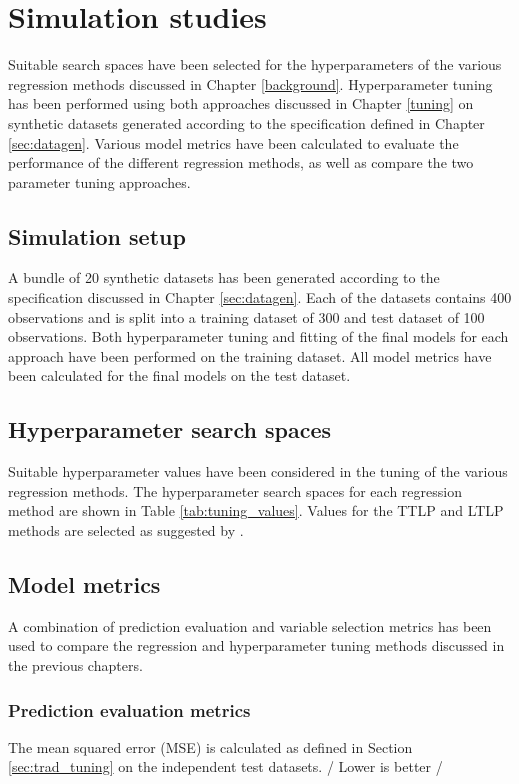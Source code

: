 \chapter{Simulation studies}
Suitable search spaces have been selected for the hyperparameters of the various regression methods discussed in Chapter \ref{background}. Hyperparameter tuning has been performed using both approaches discussed in Chapter \ref{tuning} on synthetic datasets generated according to the specification defined in Chapter \ref{sec:datagen}. Various model metrics have been calculated to evaluate the performance of the different regression methods, as well as compare the two parameter tuning approaches.


\section{Simulation setup}
A bundle of 20 synthetic datasets has been generated according to the specification discussed in Chapter \ref{sec:datagen}. Each of the datasets contains 400 observations and is split into a training dataset of 300 and test dataset of 100 observations. Both hyperparameter tuning and fitting of the final models for each approach have been performed on the training dataset. All model metrics have been calculated for the final models on the test dataset.


\section{Hyperparameter search spaces}
Suitable hyperparameter values have been considered in the tuning of the various regression methods. The hyperparameter search spaces for each regression method are shown in Table \ref{tab:tuning_values}. Values for the TTLP and LTLP methods are selected as suggested by \cite{kim2013network}.



\section{Model metrics}
A combination of prediction evaluation and variable selection metrics has been used to compare the regression and hyperparameter tuning methods discussed in the previous chapters.

\subsection{Prediction evaluation metrics}
The mean squared error (MSE) is calculated as defined in Section \ref{sec:trad_tuning} on the independent test datasets. / Lower is better /

